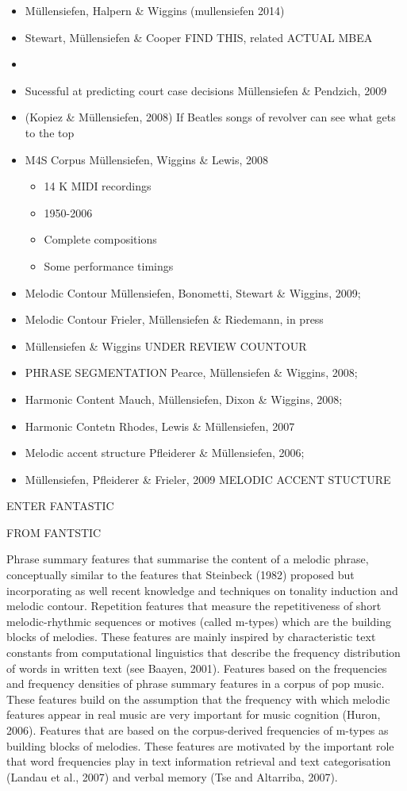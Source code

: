 \documentclass[]{book}
\providecommand{\tightlist}{%
  \setlength{\itemsep}{0pt}\setlength{\parskip}{0pt}}
\theoremstyle{definition}
\theoremstyle{definition}
\theoremstyle{definition}
\theoremstyle{remark}
\begin{document}
\begin{itemize}
\item
  Müllensiefen, Halpern \& Wiggins (mullensiefen 2014)
\item
  Stewart, Müllensiefen \& Cooper FIND THIS, related ACTUAL MBEA
\item
\item
  Sucessful at predicting court case decisions Müllensiefen \& Pendzich,
  2009
\item
  (Kopiez \& Müllensiefen, 2008) If Beatles songs of revolver can see
  what gets to the top
\item
  M4S Corpus Müllensiefen, Wiggins \& Lewis, 2008

  \begin{itemize}
  \tightlist
  \item
    14 K MIDI recordings
  \item
    1950-2006
  \item
    Complete compositions
  \item
    Some performance timings
  \end{itemize}
\item
  Melodic Contour Müllensiefen, Bonometti, Stewart \& Wiggins, 2009;
\item
  Melodic Contour Frieler, Müllensiefen \& Riedemann, in press
\item
  Müllensiefen \& Wiggins UNDER REVIEW COUNTOUR
\item
  PHRASE SEGMENTATION Pearce, Müllensiefen \& Wiggins, 2008;
\item
  Harmonic Content Mauch, Müllensiefen, Dixon \& Wiggins, 2008;
\item
  Harmonic Contetn Rhodes, Lewis \& Müllensiefen, 2007
\item
  Melodic accent structure Pfleiderer \& Müllensiefen, 2006;
\item
  Müllensiefen, Pfleiderer \& Frieler, 2009 MELODIC ACCENT STUCTURE
\end{itemize}

ENTER FANTASTIC

FROM FANTSTIC

Phrase summary features that summarise the content of a melodic phrase,
conceptually similar to the features that Steinbeck (1982) proposed but
incorporating as well recent knowledge and techniques on tonality
induction and melodic contour. Repetition features that measure the
repetitiveness of short melodic-rhythmic sequences or motives (called
m-types) which are the building blocks of melodies. These features are
mainly inspired by characteristic text constants from computational
linguistics that describe the frequency distribution of words in written
text (see Baayen, 2001). Features based on the frequencies and frequency
densities of phrase summary features in a corpus of pop music. These
features build on the assumption that the frequency with which melodic
features appear in real music are very important for music cognition
(Huron, 2006). Features that are based on the corpus-derived frequencies
of m-types as building blocks of melodies. These features are motivated
by the important role that word frequencies play in text information
retrieval and text categorisation (Landau et al., 2007) and verbal
memory (Tse and Altarriba, 2007).
\end{document}
